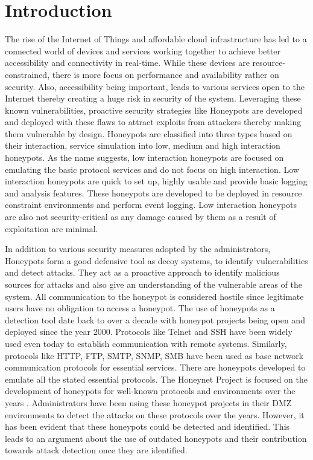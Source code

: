 \section{Introduction}

The rise of the Internet of Things and affordable cloud infrastructure has led to a connected world of devices and services working together to achieve better accessibility and connectivity in real-time. While these devices are resource-constrained, there is more focus on performance and availability rather on security. Also, accessibility being important, leads to various services open to the Internet thereby creating a huge risk in security of the system. Leveraging these known vulnerabilities, proactive security strategies like Honeypots are developed and deployed with these flaws to attract exploits from attackers thereby making them vulnerable by design. Honeypots are classified into three types based on their interaction, service simulation into low, medium and high interaction honeypots. As the name suggests, low interaction honeypots are focused on emulating the basic protocol services and do not focus on high interaction. Low interaction honeypots are quick to set up, highly usable and provide basic logging and analysis features. These honeypots are developed to be deployed in resource constraint environments and perform event logging. Low interaction honeypots are also not security-critical as any damage caused by them as a result of exploitation are minimal.

In addition to various security measures adopted by the administrators, Honeypots form a good defensive tool as decoy systems, to identify vulnerabilities and detect attacks. They act as a proactive approach to identify malicious sources for attacks and also give an understanding of the vulnerable areas of the system. All communication to the honeypot is considered hostile since legitimate users have no obligation to access a honeypot. The use of honeypots as a detection tool date back to over a decade with honeypot projects being open and deployed since the year 2000. Protocols like Telnet and SSH have been widely used even today to establish communication with remote systems. Similarly, protocols like HTTP, FTP, SMTP, SNMP, SMB have been used as base network communication protocols for essential services. There are honeypots developed to emulate all the stated essential protocols. The Honeynet Project is focused on the development of honeypots for well-known protocols and environments over the years \cite{Honeynet}. Administrators have been using these honeypot projects in their DMZ environments to detect the attacks on these protocols over the years. However, it has been evident that these honeypots could be detected and identified. This leads to an argument about the use of outdated honeypots and their contribution towards attack detection once they are identified\cite{counting}.

